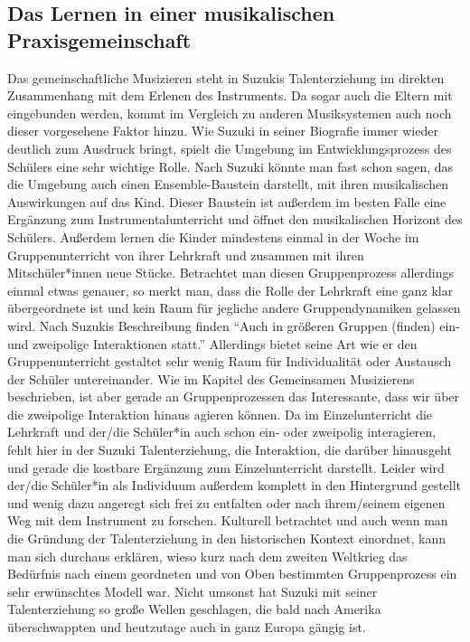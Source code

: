 \subsection{Das Lernen in einer musikalischen Praxisgemeinschaft}
Das gemeinschaftliche Musizieren steht in Suzukis Talenterziehung im direkten
Zusammenhang mit dem Erlenen des Instruments. Da sogar auch die Eltern mit
eingebunden werden, kommt im Vergleich zu anderen Musiksystemen auch noch dieser
vorgesehene Faktor hinzu. Wie Suzuki in seiner Biografie immer wieder deutlich
zum Ausdruck bringt, spielt die Umgebung im Entwicklungsprozess des Schülers
eine sehr wichtige Rolle. Nach Suzuki könnte man fast schon sagen, das die
Umgebung auch einen Ensemble-Baustein darstellt, mit ihren musikalischen
Auswirkungen auf das Kind. Dieser Baustein ist außerdem im besten Falle eine
Ergänzung zum Instrumentalunterricht und öffnet den musikalischen Horizont des
Schülers. Außerdem lernen die Kinder mindestens einmal in der Woche im
Gruppenunterricht von ihrer Lehrkraft und zusammen mit ihren Mitschüler*innen
neue Stücke. Betrachtet man diesen Gruppenprozess allerdings einmal etwas
genauer, so merkt man, dass die Rolle der Lehrkraft eine ganz klar übergeordnete
ist und kein Raum für jegliche andere Gruppendynamiken gelassen wird. Nach
Suzukis Beschreibung finden \enquote{Auch in größeren Gruppen (finden) ein- und
zweipolige Interaktionen statt.} \autocite[30]{suzuki:erziehung_ist_liebe}
Allerdings bietet seine Art wie er den Gruppenunterricht gestaltet sehr wenig
Raum für Individualität oder Austausch der Schüler untereinander. Wie im Kapitel
des Gemeinsamen Musizierens beschrieben, ist aber gerade an Gruppenprozessen das
Interessante, dass wir über die zweipolige Interaktion hinaus agieren können. Da
im Einzelunterricht die Lehrkraft und der/die Schüler*in auch schon ein- oder
zweipolig interagieren, fehlt hier in der Suzuki Talenterziehung, die
Interaktion, die darüber hinausgeht und gerade die kostbare Ergänzung zum
Einzelunterricht darstellt. Leider wird der/die Schüler*in als Individuum
außerdem komplett in den Hintergrund gestellt und wenig dazu angeregt sich frei
zu entfalten oder nach ihrem/seinem eigenen Weg mit dem Instrument zu forschen.
Kulturell betrachtet und auch wenn man die Gründung der Talenterziehung in den
historischen Kontext einordnet, kann man sich durchaus erklären, wieso kurz nach
dem zweiten Weltkrieg das Bedürfnis nach einem geordneten und von Oben
bestimmten Gruppenprozess ein sehr erwünschtes Modell war. Nicht umsonst hat
Suzuki mit seiner Talenterziehung so große Wellen geschlagen, die bald nach
Amerika überschwappten und heutzutage auch in ganz Europa gängig ist.



